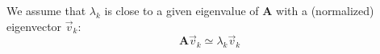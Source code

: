 \documentclass[aps,12pt]{revtex4}
\begin{document}
We assume that $\lambda_k$ is close to a given eigenvalue of $\bm{A}$ with a (normalized) eigenvector $\vec{v}_k$:
\begin{equation}
	\bm{A} \vec{v}_k \simeq \lambda_k \vec{v}_k
\end{equation}
\end{document}
